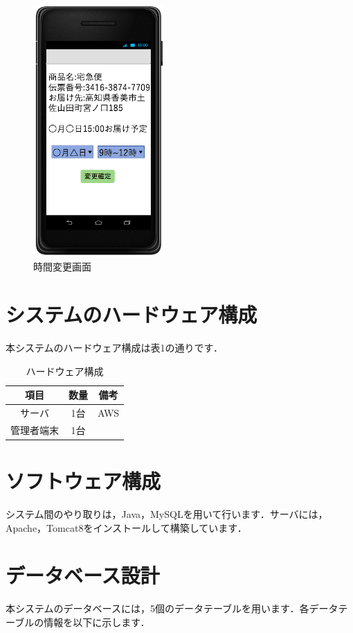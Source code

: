 \documentclass[a4j,titlepage]{jarticle}
\begin{document}
\begin{figure}[H]
 \begin{center}
  \includegraphics[width=50mm]{time_change.png}
	\caption{時間変更画面}
	\label{fig:time_change}
 \end{center}

\end{figure}
\newpage
\section{システムのハードウェア構成}
本システムのハードウェア構成は表1の通りです．
\begin{table}[H]
\begin{center}
 \caption{ハードウェア構成}
  \begin{tabular}{|c|c|c|}\hline
    項目 & 数量 & 備考\\ \hline \hline
    サーバ & 1台 & AWS\\ \hline
    管理者端末 & 1台 & \\ \hline
  \end{tabular}
\end{center}
\end{table}


\section{ソフトウェア構成}
システム間のやり取りは，Java，MySQLを用いて行います．サーバには，Apache，Tomcat8をインストールして構築しています．

\section{データベース設計}
本システムのデータベースには，5個のデータテーブルを用います．各データテーブルの情報を以下に示します．
\end{document}

